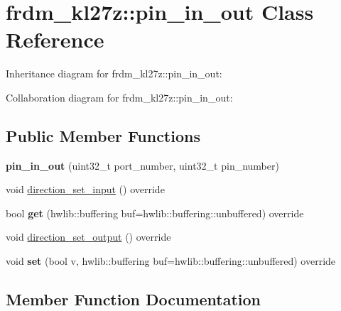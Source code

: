 \hypertarget{classfrdm__kl27z_1_1pin__in__out}{}\section{frdm\+\_\+kl27z\+:\+:pin\+\_\+in\+\_\+out Class Reference}
\label{classfrdm__kl27z_1_1pin__in__out}


Inheritance diagram for frdm\+\_\+kl27z\+:\+:pin\+\_\+in\+\_\+out\+:


Collaboration diagram for frdm\+\_\+kl27z\+:\+:pin\+\_\+in\+\_\+out\+:
\subsection*{Public Member Functions}
\begin{DoxyCompactItemize}
\item 
\mbox{\label{classfrdm__kl27z_1_1pin__in__out_ae9944138f353324e8979c2e91f32b8b3}} 
{\bfseries pin\+\_\+in\+\_\+out} (uint32\+\_\+t port\+\_\+number, uint32\+\_\+t pin\+\_\+number)
\item 
void \hyperlink{classfrdm__kl27z_1_1pin__in__out_ad79b75a4e50849d72506746cbea81160}{direction\+\_\+set\+\_\+input} () override
\item 
\mbox{\label{classfrdm__kl27z_1_1pin__in__out_a44ece8407574edcbb6ba86777dc1063d}} 
bool {\bfseries get} (hwlib\+::buffering buf=hwlib\+::buffering\+::unbuffered) override
\item 
void \hyperlink{classfrdm__kl27z_1_1pin__in__out_a329bd2ea5a7fc1516ceacc8708a1226e}{direction\+\_\+set\+\_\+output} () override
\item 
\mbox{\label{classfrdm__kl27z_1_1pin__in__out_a1ed81a826c7e55c1ed04d54cbcd73c4d}} 
void {\bfseries set} (bool v, hwlib\+::buffering buf=hwlib\+::buffering\+::unbuffered) override
\end{DoxyCompactItemize}


\subsection{Member Function Documentation}
\mbox{\label{classfrdm__kl27z_1_1pin__in__out_ad79b75a4e50849d72506746cbea81160}} 
